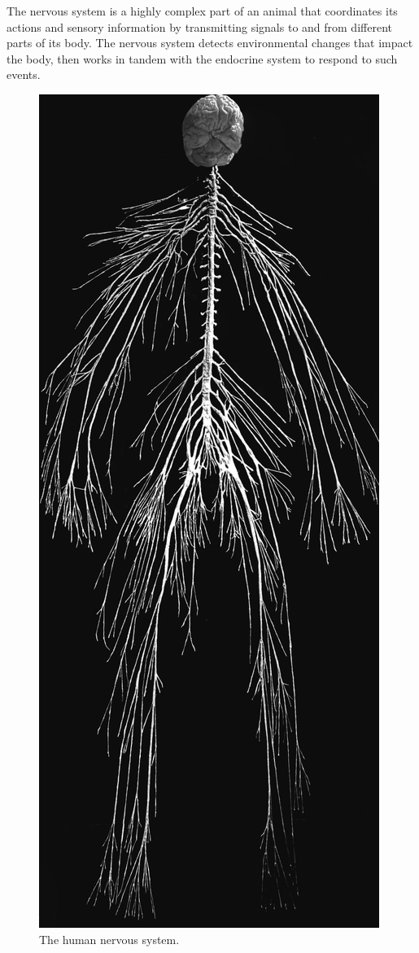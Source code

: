 The nervous system is a highly complex part of an animal that coordinates its actions and sensory information by transmitting signals to and from different parts of its body. The nervous system detects environmental changes that impact the body, then works in tandem with the endocrine system to respond to such events.



\begin{figure}

{\centering \includegraphics[width=0.7\linewidth]{./figures/nervoussystem/NervousSystem} 

}

\caption{The human nervous system.}\label{fig:nervoussystem}
\end{figure}

